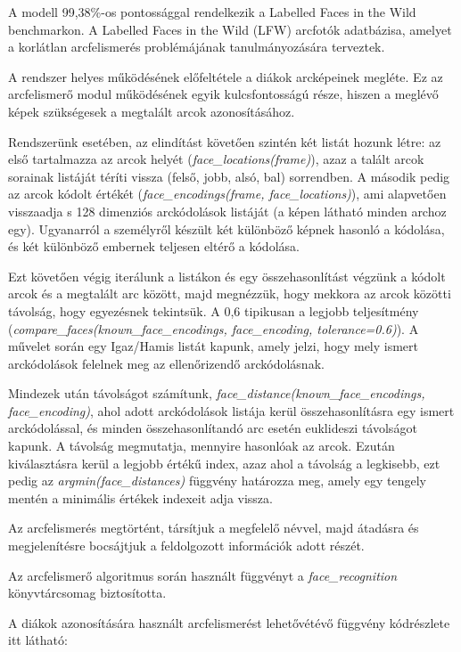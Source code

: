 A modell 99,38\%-os pontossággal rendelkezik a Labelled Faces in the Wild benchmarkon. A Labelled Faces in the Wild (LFW) arcfotók adatbázisa, amelyet a korlátlan arcfelismerés problémájának tanulmányozására terveztek.

A rendszer helyes működésének előfeltétele a diákok arcképeinek megléte. Ez az arcfelismerő modul működésének egyik kulcsfontosságú része, hiszen a meglévő képek szükségesek a megtalált arcok azonosításához.

Rendszerünk esetében, az elindítást követően szintén két listát hozunk létre: az első tartalmazza az arcok helyét (\textit{face\_locations(frame)}), azaz a talált arcok sorainak listáját téríti vissza (felső, jobb, alsó, bal) sorrendben. A második pedig az arcok kódolt értékét (\textit{face\_encodings(frame, face\_locations)}), ami alapvetően visszaadja s 128 dimenziós arckódolások listáját (a képen látható minden archoz egy). Ugyanarról a személyről készült két különböző képnek hasonló a kódolása, és két különböző embernek teljesen eltérő a kódolása.

Ezt követően végig iterálunk a listákon és egy összehasonlítást végzünk a kódolt arcok és a megtalált arc között, majd megnézzük, hogy mekkora az arcok közötti távolság, hogy egyezésnek tekintsük. A 0,6 tipikusan a legjobb teljesítmény (\textit{compare\_faces(known\_face\_encodings, face\_encoding, tolerance=0.6)}). A művelet során egy Igaz/Hamis listát kapunk, amely jelzi, hogy mely ismert arckódolások felelnek meg az ellenőrizendő arckódolásnak.

Mindezek után távolságot számítunk, \textit{face\_distance(known\_face\_encodings, face\_encoding)}, ahol adott arckódolások listája kerül összehasonlításra egy ismert arckódolással, és  minden összehasonlítandó arc esetén euklideszi távolságot kapunk.
A távolság megmutatja, mennyire hasonlóak az arcok. Ezután kiválasztásra kerül a legjobb értékű index, azaz ahol a távolság a legkisebb, ezt pedig az \textit{argmin(face\_distances)} függvény határozza meg, amely egy tengely mentén a minimális értékek indexeit adja vissza.

Az arcfelismerés megtörtént, társítjuk a megfelelő névvel, majd átadásra és megjelenítésre bocsájtjuk a feldolgozott információk adott részét.

Az arcfelismerő algoritmus során használt függvényt a \textit{face\_recognition} könyvtárcsomag biztosította.

A diákok azonosítására használt arcfelismerést lehetővétévő függvény kódrészlete itt látható: 

